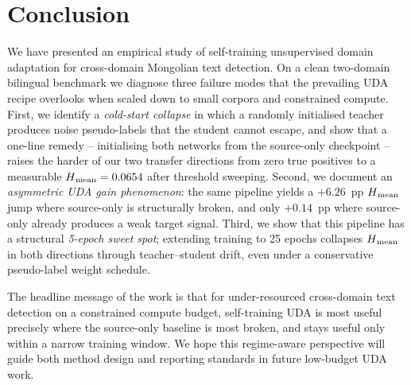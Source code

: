 \section{Conclusion}
\label{sec:conclusion}

We have presented an empirical study of self-training unsupervised
domain adaptation for cross-domain Mongolian text detection.
On a clean two-domain bilingual benchmark we diagnose three failure
modes that the prevailing UDA recipe overlooks when scaled down to
small corpora and constrained compute. First, we identify a
\emph{cold-start collapse} in which a randomly initialised teacher
produces noise pseudo-labels that the student cannot escape, and show
that a one-line remedy -- initialising both networks from the
source-only checkpoint -- raises the harder of our two transfer
directions from zero true positives to a measurable
$H\textsubscript{mean} = 0.0654$ after threshold sweeping. Second, we document an
\emph{asymmetric UDA gain phenomenon}: the same pipeline yields a
$+6.26$~pp $H\textsubscript{mean}$ jump where source-only is structurally broken,
and only $+0.14$~pp where source-only already produces a weak target
signal. Third, we show that this pipeline has a structural
\emph{5-epoch sweet spot}; extending training to 25 epochs collapses
$H\textsubscript{mean}$ in both directions through teacher--student drift, even
under a conservative pseudo-label weight schedule.

The headline message of the work is that for under-resourced
cross-domain text detection on a constrained compute budget,
self-training UDA is most useful precisely where the source-only
baseline is most broken, and stays useful only within a narrow
training window. We hope this regime-aware perspective will guide
both method design and reporting standards in future low-budget UDA
work.
